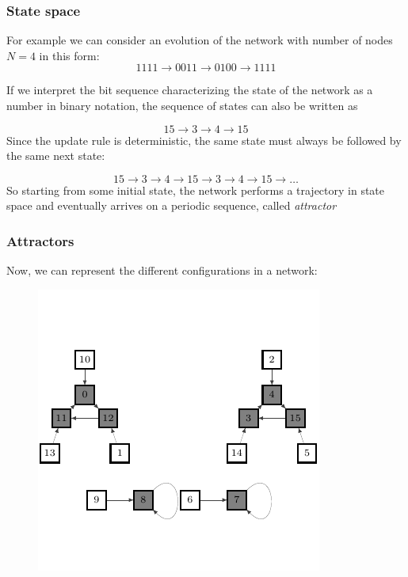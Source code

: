 \documentclass{beamer}
\begin{document}
\begin{frame}
\frametitle{State space}
For example we can consider an evolution of the network with number of nodes $N=4$ in this form:
$$
1111 \to 0011 \to 0100 \to 1111
$$

If we interpret the bit sequence characterizing the state of the network as a number in binary notation, the sequence of states can also be
written as

$$
15 \to 3 \to 4 \to 15
$$
 Since
the update rule is deterministic, the same state must always be followed by
the same next state:

$$
15 \to 3 \to 4 \to 15 \to 3 \to 4 \to 15 \to \dots
$$
So starting from some initial state, the network performs a trajectory in state space and eventually arrives on a periodic sequence, called \emph{attractor}
\end{frame}






\begin{frame}
\frametitle{Attractors}
Now, we can represent the different configurations in a network:
\begin{figure}
\centering
\includegraphics{fg3.pdf}
\end{figure}
\end{frame}
\end{document}
